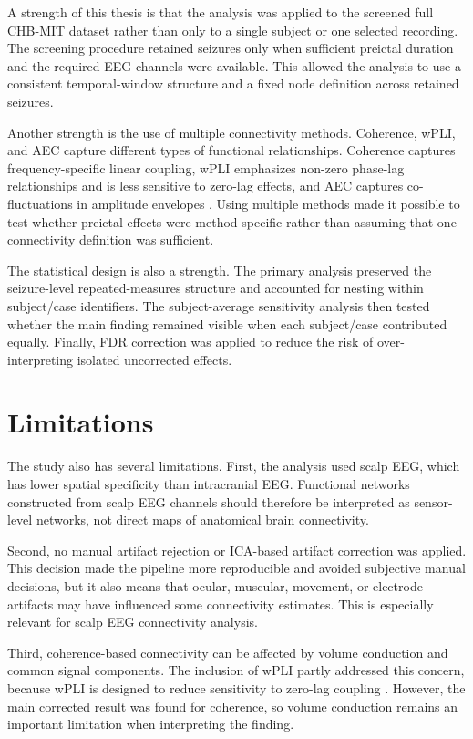 A strength of this thesis is that the analysis was applied to the screened
full CHB-MIT dataset rather than only to a single subject or one selected
recording. The screening procedure retained seizures only when sufficient
preictal duration and the required EEG channels were available. This allowed the
analysis to use a consistent temporal-window structure and a fixed node
definition across retained seizures.

Another strength is the use of multiple connectivity methods. Coherence, wPLI,
and AEC capture different types of functional relationships. Coherence captures
frequency-specific linear coupling, wPLI emphasizes non-zero phase-lag
relationships and is less sensitive to zero-lag effects, and AEC captures
co-fluctuations in amplitude envelopes \cite{Vinck2011,Bruns2000,Hipp2012}.
Using multiple methods made it possible to test whether preictal effects were
method-specific rather than assuming that one connectivity definition was
sufficient.

The statistical design is also a strength. The primary analysis preserved the
seizure-level repeated-measures structure and accounted for nesting within
subject/case identifiers. The subject-average sensitivity analysis then tested
whether the main finding remained visible when each subject/case contributed
equally. Finally, FDR correction was applied to reduce the risk of
over-interpreting isolated uncorrected effects.

\section{Limitations}
\label{sec:discussion-limitations}

The study also has several limitations. First, the analysis used scalp EEG,
which has lower spatial specificity than intracranial EEG. Functional networks
constructed from scalp EEG channels should therefore be interpreted as
sensor-level networks, not direct maps of anatomical brain connectivity.

Second, no manual artifact rejection or ICA-based artifact correction was
applied. This decision made the pipeline more reproducible and avoided
subjective manual decisions, but it also means that ocular, muscular, movement,
or electrode artifacts may have influenced some connectivity estimates. This is
especially relevant for scalp EEG connectivity analysis.

Third, coherence-based connectivity can be affected by volume conduction and
common signal components. The inclusion of wPLI partly addressed this concern,
because wPLI is designed to reduce sensitivity to zero-lag coupling
\cite{Vinck2011}. However, the main corrected result was found for coherence,
so volume conduction remains an important limitation when interpreting the
finding.

